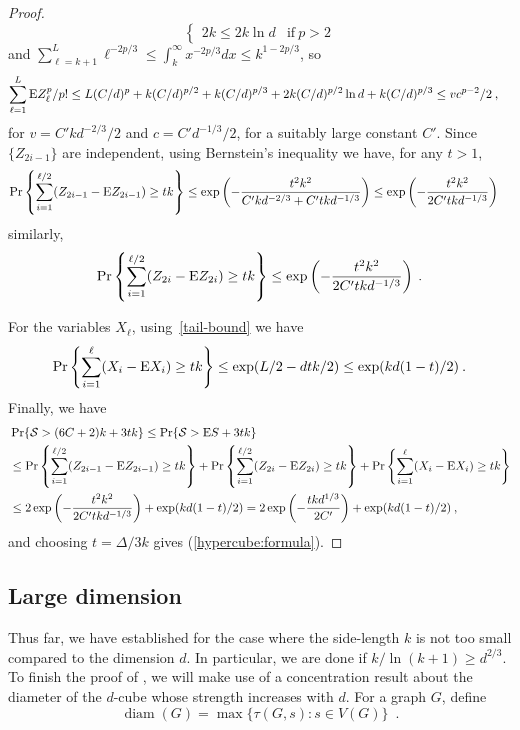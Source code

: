 \documentclass{patmorin}
\DeclareMathOperator{\diam}{diam}
\newcommand{\abas}[1]{\textcolor{orange}{\big[Abbas: #1\big]}}
\begin{document}
\begin{proof}
\[\begin{cases}
 2k \leq 2 k \ln d &  \mathrm{if\ }  p>2
\end{cases}
\]
 and 
$\sum_{\ell=k+1}^{L}\ell^{-2p/3} \leq 
\int_{k}^{\infty} x^{-2p/3} dx \leq
k^{1-2p/3}$, so
\begin{align*}
\sum_{\ell=1}^{L} \mathrm{E} Z_{\ell}^p / p!
&
\leq L (C/d)^{p}
+
k (C/d)^{p/2}
+ k(C/d)^{p/3} 
+
2k(C/d)^{p/2} \ln d
+
 k(C/d)^{p/3} \leq v c^{p-2}/2\:,
\end{align*}
for $v = C' k d^{-2/3}/2$ and
$c = C' d^{-1/3}/2$,
for a suitably large constant $C'$.
Since $\{Z_{2i-1}\}$ are independent, using Bernstein's inequality we have, for any $t>1$,
\begin{align*}
\Pr \left\{ \sum_{i=1}^{\ell/2} (Z_{2i-1} - \mathrm{E} Z_{2i-1}) 
\geq tk
\right\}&
\leq \exp\left(-\frac{t^2k^2}{C'kd^{-2/3} + C'tkd^{-1/3}}\right)
\leq
\exp\left(-\frac{t^2k^2}{2C'tkd^{-1/3}}\right)
\end{align*}
similarly,
\[
\Pr \left\{ \sum_{i=1}^{\ell/2} (Z_{2i} - \mathrm{E} Z_{2i}) 
\geq t k
\right\}\leq \exp\left(-\frac{t^2k^2}{ 2C'tkd^{-1/3}}\right)
\:.
\]

For the variables $X_{\ell}$, using~\eqref{tail-bound} we have
\[
\Pr \left\{ \sum_{i=1}^{\ell} (X_{i} - \mathrm{E} X_{i}) 
\geq tk
\right\}\leq
\exp(L/2-dtk/2)\leq
\exp(kd(1-t)/2)\:.
\]
Finally, we have
\begin{align*}
&\Pr\{\mathcal S > (6C+2)k+3tk \}
 \leq
\Pr\{\mathcal S > \mathrm{E} S + 3tk\} \\
& \leq
\Pr \left\{ \sum_{i=1}^{\ell/2} (Z_{2i-1} - \mathrm{E} Z_{2i-1}) 
\geq tk
\right\}
+
\Pr \left\{ \sum_{i=1}^{\ell/2} (Z_{2i} - \mathrm{E} Z_{2i}) 
\geq tk
\right\}
+
\Pr \left\{ \sum_{i=1}^{\ell} (X_{i} - \mathrm{E} X_{i}) 
\geq tk
\right\}\\
& \leq
2 \exp\left(-\frac{t^2k^2}{2C'tkd^{-1/3}}\right)+
\exp(kd(1-t)/2)
=
2 \exp\left(-\frac{tkd^{1/3}}{2C'}\right)+
\exp(kd(1-t)/2)
\:,
\end{align*}
and choosing $t = \Delta/3k$ gives (\ref{hypercube:formula}).
\end{proof}

\subsection{Large dimension}

Thus far, we have established  for the case
where the side-length $k$ is not too small compared to the dimension $d$.
In particular, we are done if $k/\ln(k+1) \geq d^{2/3}$.  To finish the
proof of , we will make use of a concentration
result about the diameter of the $d$-cube whose strength increases
with $d$.  For a graph $G$, define
\[
    \diam(G) = \max\{\tau(G,s) : s\in V(G)\} \enspace .
\]
\end{document}

